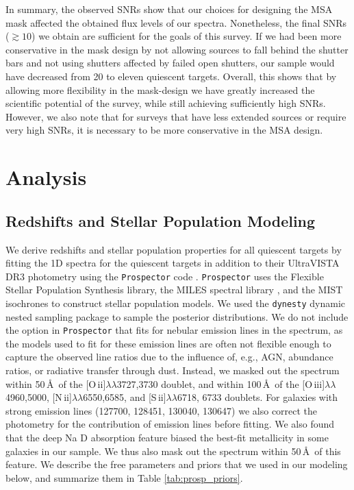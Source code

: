 \documentclass[twocolumn, astrosymb]{aastex631}
\begin{document}
In summary, the observed SNRs show that our choices for designing the MSA mask affected the obtained flux levels of our spectra. Nonetheless, the final SNRs ($\gtrsim 10$) we obtain are sufficient for the goals of this survey. If we had been more conservative in the mask design by not allowing sources to fall behind the shutter bars and not using shutters affected by failed open shutters, our sample would have decreased from 20 to eleven quiescent targets. Overall, this shows that by allowing more flexibility in the mask-design we have greatly increased the scientific potential of the survey, while still achieving sufficiently high SNRs. However, we also note that for surveys that have less extended sources or require very high SNRs, it is necessary to be more conservative in the MSA design.

\section{Analysis}\label{sec:analysis}
\subsection{Redshifts and Stellar Population Modeling}\label{sec:prosp}
We derive redshifts and stellar population properties for all quiescent targets by fitting the 1D spectra for the quiescent targets in addition to their UltraVISTA DR3 photometry \citep{AMuzzin2013a} using the \texttt{Prospector} code \citep{JLeja2019, BJohnson2021}. \texttt{Prospector} uses the Flexible Stellar Population Synthesis \citep[FSPS;][]{CConroy2009, CConroy2010} library, the MILES spectral library \citep{JFalcon2011}, and the MIST isochrones \citep{JChoi2016, ADotter2016} to construct stellar population models. We used the \texttt{dynesty} dynamic nested sampling package \citep{JSpeagle2020} to sample the posterior distributions. We do not include the option in \texttt{Prospector} that fits for nebular emission lines in the spectrum, as the models used to fit for these emission lines are often not flexible enough to capture the observed line ratios due to the influence of, e.g., AGN, abundance ratios, or radiative transfer through dust. Instead, we masked out the spectrum within 50\,\AA\ of the [O\,{\sc ii}]$\lambda\lambda$3727,3730 doublet, and within 100\,\AA\ of the [O\,{\sc iii}]$\lambda\lambda$4960,5000, [N\,{\sc ii}]$\lambda\lambda$6550,6585, and [S\,{\sc ii}]$\lambda\lambda$6718, 6733 doublets. For galaxies with strong emission lines (127700, 128451, 130040, 130647) we also correct the photometry for the contribution of emission lines before fitting. We also found that the deep Na D absorption feature biased the best-fit metallicity in some galaxies in our sample. We thus also mask out the spectrum within 50\,\AA\ of this feature. We describe the free parameters and priors that we used in our modeling below, and summarize them in Table \ref{tab:prosp_priors}.
\end{document}
